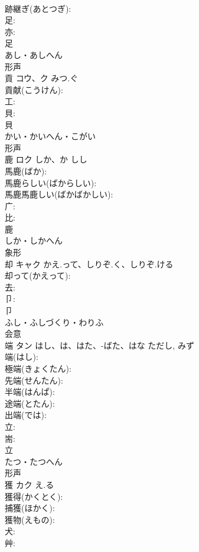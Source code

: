 \documentclass[8pt]{extreport}
\begin{document}
\begin{CJK}{UTF8}{min}
\\	跡継ぎ(あとつぎ): 
\\	足: 
\\	亦: 
\\	足	
\\	あし・あしへん	
\\	形声 
\\	貢	コウ、ク	みつ.ぐ		
\\	貢献(こうけん): 
\\	工: 
\\	貝: 
\\	貝	
\\	かい・かいへん・こがい	
\\	形声 
\\	鹿	ロク	しか、か	しし	
\\	馬鹿(ばか): 
\\	馬鹿らしい(ばからしい): 
\\	馬鹿馬鹿しい(ばかばかしい): 
\\	广: 
\\	比: 
\\	鹿	
\\	しか・しかへん	
\\	象形 
\\	却	キャク	かえ.って、しりぞ.く、しりぞ.ける		
\\	却って(かえって): 
\\	去: 
\\	卩: 
\\	卩	
\\	ふし・ふしづくり・わりふ	
\\	会意 
\\	端	タン	はし、は、はた、-ばた、はな	ただし, みず	
\\	端(はし): 
\\	極端(きょくたん): 
\\	先端(せんたん): 
\\	半端(はんぱ): 
\\	途端(とたん): 
\\	出端(では): 
\\	立: 
\\	耑: 
\\	立	
\\	たつ・たつへん	
\\	形声 
\\	獲	カク	え.る		
\\	獲得(かくとく): 
\\	捕獲(ほかく): 
\\	獲物(えもの): 
\\	犬: 
\\	艸: 

\end{CJK}
\end{document}
